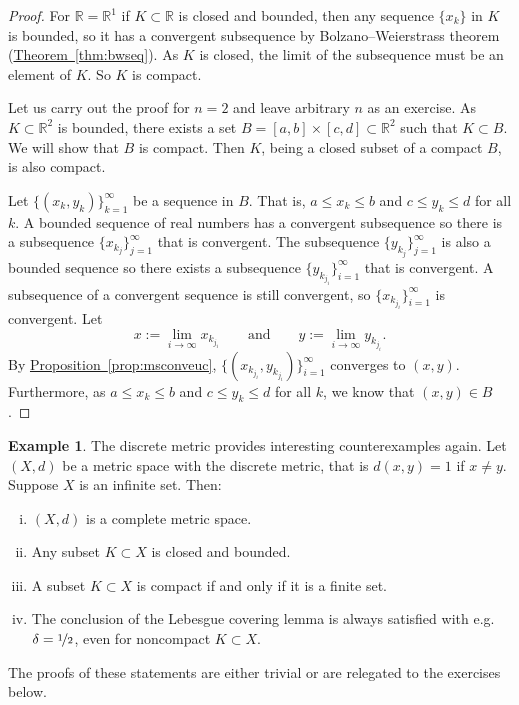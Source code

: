 \documentclass[12pt]{book}
\newcommand{\R}{{\mathbb{R}}}
\theoremstyle{plain}
\theoremstyle{remark}
\theoremstyle{definition}
\theoremstyle{exercise}
\theoremstyle{example}
\newtheorem{example}[thm]{Example}
\newcommand{\thmref}[1]{\hyperref[#1]{Theorem~\ref*{#1}}}
\newcommand{\propref}[1]{\hyperref[#1]{Proposition~\ref*{#1}}}
\begin{document}
\begin{proof}
For $\R = \R^1$ if $K \subset \R$ is closed and bounded, then
any sequence $\{ x_k \}$ in $K$ is bounded, so it has a convergent
subsequence by
Bolzano--Weierstrass theorem (\thmref{thm:bwseq}).
As $K$ is closed, the limit of the subsequence must be an element of
$K$.  So $K$ is compact.

Let us carry out the proof for $n=2$ and leave arbitrary $n$ as an exercise.
As $K \subset \R^2$ is bounded, there exists a set
$B=[a,b]\times[c,d] \subset \R^2$ such that $K \subset B$.  We will show
that $B$ is compact.  Then $K$, being a closed subset of a compact $B$, is
also compact.  

Let $\{ (x_k,y_k) \}_{k=1}^\infty$ be a sequence in $B$.  That is,
$a \leq x_k \leq b$ and
$c \leq y_k \leq d$ for all $k$.  A bounded sequence of real numbers
has a convergent
subsequence so there is a subsequence $\{ x_{k_j} \}_{j=1}^\infty$
that is convergent.  The subsequence 
$\{ y_{k_j} \}_{j=1}^\infty$ is also a bounded sequence so there exists
a subsequence
$\{ y_{k_{j_i}} \}_{i=1}^\infty$ that is convergent.  A subsequence of a
convergent sequence is still convergent, so 
$\{ x_{k_{j_i}} \}_{i=1}^\infty$ is convergent.
Let
\begin{equation*}
x := \lim_{i\to\infty} x_{k_{j_i}}
\qquad \text{and} \qquad
y := \lim_{i\to\infty} y_{k_{j_i}} .
\end{equation*}
By \propref{prop:msconveuc},
$\bigl\{ (x_{k_{j_i}},y_{k_{j_i}}) \bigr\}_{i=1}^\infty$ converges to $(x,y)$.
Furthermore, as $a \leq x_k \leq b$ and
$c \leq y_k \leq d$ for all $k$, we know that $(x,y) \in B$.
\end{proof}

\begin{example}
The discrete metric provides interesting counterexamples again.
Let $(X,d)$ be a metric space with the discrete metric, that is $d(x,y) = 1$
if $x \not= y$.  Suppose
$X$ is an infinite set.  Then:
\begin{enumerate}[(i)]
\item $(X,d)$ is a complete metric space.
\item Any subset $K \subset X$ is closed and bounded.
\item A subset $K \subset X$ is compact if and only if it is a finite set.
\item The conclusion of the Lebesgue covering lemma is always satisfied with
e.g. $\delta = \nicefrac{1}{2}$, even for noncompact $K \subset X$.
\end{enumerate}
The proofs
of these statements are either trivial or are relegated to the exercises
below.
\end{example}
\end{document}
